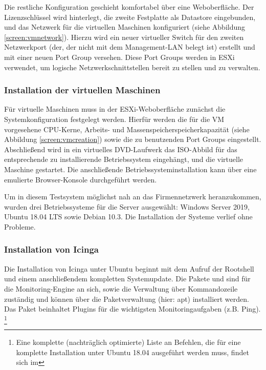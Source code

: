 Die restliche Konfiguration geschieht komfortabel über eine Weboberfläche. Der Lizenzschlüssel wird hinterlegt, die zweite Festplatte als Datastore eingebunden, und das Netzwerk für die virtuellen Maschinen konfiguriert (siehe Abbildung \ref{screen:vmnetwork}). Hierzu wird ein neuer virtueller Switch für den zweiten Netzwerkport (der, der nicht mit dem Management-LAN belegt ist) erstellt und mit einer neuen Port Group versehen. Diese Port Groups werden in ESXi verwendet, um logische Netzwerkschnittstellen bereit zu stellen und zu verwalten. 

\subsubsection{Installation der virtuellen Maschinen}
\label{sec:InstallationVMs}
Für virtuelle Maschinen muss in der ESXi-Weboberfläche zunächst die Systemkonfiguration festgelegt werden. Hierfür werden die für die VM vorgesehene CPU-Kerne, Arbeits- und Massenspeicherspeicherkapazität (siehe Abbildung \ref{screen:vmcreation}) sowie die zu benutzenden Port Groups eingestellt. Abschließend wird in ein virtuelles DVD-Laufwerk das ISO-Abbild für das entsprechende zu installierende Betriebssystem eingehängt, und die virtuelle Maschine gestartet. Die anschließende Betriebssysteminstallation kann über eine emulierte Browser-Konsole durchgeführt werden.

Um in diesem Testsystem möglichst nah an das Firmennetzwerk heranzukommen, wurden drei Betriebssysteme für die Server ausgewählt: Windows Server 2019, Ubuntu 18.04 LTS sowie Debian 10.3. Die Installation der Systeme verlief ohne Probleme.

\subsubsection{Installation von \glqq{}Icinga\grqq{}}
\label{sec:InstallationIcinga}
Die Installation von \glqq{}Icinga\grqq{} unter Ubuntu beginnt mit dem Aufruf der Rootshell und einem anschließendem kompletten Systemupdate. Die Pakete  und  sind für die Monitoring-Engine an sich, sowie die Verwaltung über Kommandozeile zuständig und können über die Paketverwaltung (hier: apt) installiert werden. Das Paket  beinhaltet Plugins für die wichtigsten Monitoringaufgaben (z.B. Ping).
\footnote{Eine komplette (nachträglich optimierte) Liste an Befehlen, die für eine komplette Installation unter Ubuntu 18.04 ausgeführt werden muss, findet sich im }

